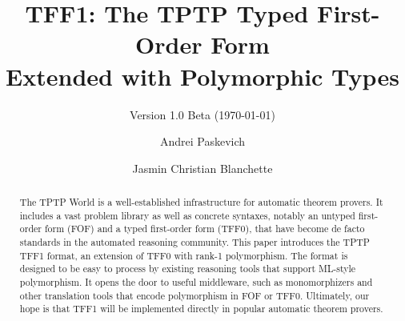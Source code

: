 \documentclass[draft,a4paper]{llncs}
\begin{document}
\title{
TFF1: The TPTP Typed First-Order Form \\ Extended with %
Polymorphic Types}
\subtitle{Version 1.0 Beta (\today)}

\author{
Andrei Paskevich \and Jasmin Christian Blanchette
}


\maketitle

\begin{abstract}
The TPTP World is a well-established infrastructure for automatic theorem
provers. It includes a vast problem library as well as concrete syntaxes,
notably an untyped first-order form (FOF) and a typed first-order form (TFF0),
that have become de facto standards in the automated reasoning
community. This paper introduces the TPTP TFF1 format, an extension of TFF0 with
rank-1 polymorphism. The format is designed to be easy to process by existing
reasoning tools that support ML-style polymorphism. It opens the door to useful
middleware, such as monomorphizers and other translation tools that encode
polymorphism in FOF or TFF0. Ultimately, our hope is that TFF1 will be
implemented directly in popular automatic theorem provers.
\end{abstract}












\end{document}
